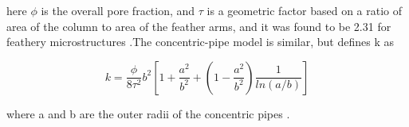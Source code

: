 \documentclass[%
 aip,
 amsmath,amssymb,
 reprint,%
floatfix]{revtex4-1}
\begin{document}
\noindent here $\phi$ is the overall pore fraction, and $\tau$ is a geometric factor based on a ratio of area of the column to area of the feather arms, and it was found to be 2.31 for feathery microstructures \cite{Naraparaju2019}.The concentric-pipe model is similar, but defines k as

\begin{equation}
    k=\frac{\phi}{8\tau^2}b^2\left[1+\frac{a^2}{b^2}+\left(1-\frac{a^2}{b^2}\right)\frac{1}{ln\left(a/b\right)}\right]
    \label{eq:CPM}
\end{equation}

\noindent where a and b are the outer radii of the concentric pipes \cite{Naraparaju2019}. 

\nocite{*}
\end{document}
